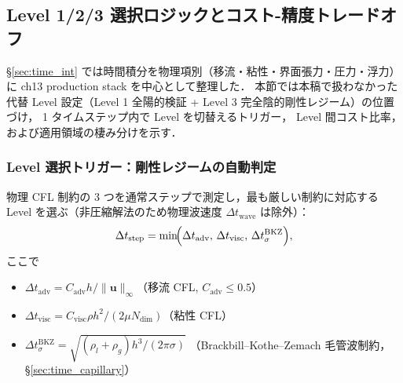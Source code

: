 %
%
\subsection{Level 1/2/3 選択ロジックとコスト-精度トレードオフ}
\label{sec:level_selection}

§\ref{sec:time_int} では時間積分を物理項別（移流・粘性・界面張力・圧力・浮力）に
ch13 production stack を中心として整理した．
本節では本稿で扱わなかった代替 Level 設定（Level 1 全陽的検証 +
Level 3 完全陰的剛性レジーム）の位置づけ，
1 タイムステップ内で Level を切替えるトリガー，
Level 間コスト比率，および適用領域の棲み分けを示す．

\subsubsection{Level 選択トリガー：剛性レジームの自動判定}
\label{sec:level_trigger}

物理 CFL 制約の 3 つを通常ステップで測定し，最も厳しい制約に対応する
Level を選ぶ（非圧縮解法のため物理波速度 $\Delta t_\text{wave}$ は除外）：
\begin{equation}
  \Delta t_\text{step}
    = \min\!\Bigl(
        \Delta t_\text{adv},\,
        \Delta t_\text{visc},\,
        \Delta t_\sigma^\text{BKZ}
      \Bigr),
  \label{eq:level_cfl_min}
\end{equation}
ここで
\begin{itemize}[noitemsep]
  \item $\Delta t_\text{adv} = C_\text{adv} h/\|\mathbf{u}\|_\infty$（移流 CFL, $C_\text{adv}\le 0.5$）
  \item $\Delta t_\text{visc} = C_\text{visc}\rho h^2/(2\mu N_\text{dim})$（粘性 CFL）
  \item $\Delta t_\sigma^\text{BKZ} = \sqrt{(\rho_l+\rho_g)h^3/(2\pi\sigma)}$
        （Brackbill--Kothe--Zemach 毛管波制約，§\ref{sec:time_capillary}）
\end{itemize}

